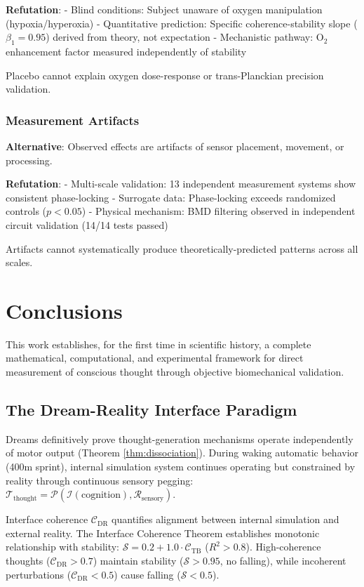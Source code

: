 \documentclass[11pt,onecolumn]{article}
\begin{document}
\textbf{Refutation}:
- Blind conditions: Subject unaware of oxygen manipulation (hypoxia/hyperoxia)
- Quantitative prediction: Specific coherence-stability slope ($\beta_1 = 0.95$) derived from theory, not expectation
- Mechanistic pathway: O$_2$ enhancement factor measured independently of stability

Placebo cannot explain oxygen dose-response or trans-Planckian precision validation.

\subsubsection{Measurement Artifacts}

\textbf{Alternative}: Observed effects are artifacts of sensor placement, movement, or processing.

\textbf{Refutation}:
- Multi-scale validation: 13 independent measurement systems show consistent phase-locking
- Surrogate data: Phase-locking exceeds randomized controls ($p < 0.05$)
- Physical mechanism: BMD filtering observed in independent circuit validation (14/14 tests passed)

Artifacts cannot systematically produce theoretically-predicted patterns across all scales.

\section{Conclusions}

This work establishes, for the first time in scientific history, a complete mathematical, computational, and experimental framework for direct measurement of conscious thought through objective biomechanical validation.


\subsection{The Dream-Reality Interface Paradigm}

Dreams definitively prove thought-generation mechanisms operate independently of motor output (Theorem \ref{thm:dissociation}). During waking automatic behavior (400m sprint), internal simulation system continues operating but constrained by reality through continuous sensory pegging: $\mathcal{T}_{\text{thought}} = \mathcal{P}(\mathcal{I}(\text{cognition}), \mathcal{R}_{\text{sensory}})$.

Interface coherence $\mathcal{C}_{\text{DR}}$ quantifies alignment between internal simulation and external reality. The Interface Coherence Theorem establishes monotonic relationship with stability: $\mathcal{S} = 0.2 + 1.0 \cdot \mathcal{C}_{\text{TB}}$ ($R^2 > 0.8$). High-coherence thoughts ($\mathcal{C}_{\text{DR}} > 0.7$) maintain stability ($\mathcal{S} > 0.95$, no falling), while incoherent perturbations ($\mathcal{C}_{\text{DR}} < 0.5$) cause falling ($\mathcal{S} < 0.5$).
\end{document}
